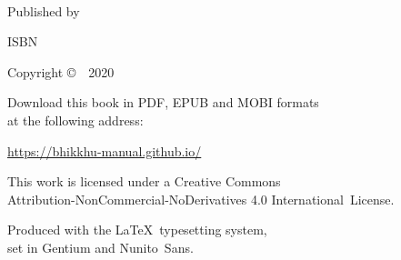 \cleartoverso
\thispagestyle{empty}

{\copyrightsize
\centering
\setlength{\parindent}{0pt}%
\setlength{\parskip}{0.8\baselineskip}%

\thetitle\\
\thesubtitle

Published by \thePublisher

ISBN \theISBN

Copyright \copyright\ \thePublisher\ 2020

Download this book in PDF, EPUB and MOBI formats\\
at the following address:

\href{https://bhikkhu-manual.github.io/}{https://bhikkhu-manual.github.io/}

\vfill

{\footnotesize

This work is licensed under a Creative Commons\\
Attribution-NonCommercial-NoDerivatives 4.0 International~License.

Produced with the \LaTeX\ typesetting system,\\
set in Gentium and Nunito~Sans.

\theEditionInfo

}}
